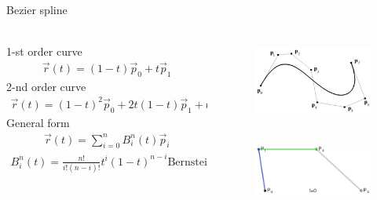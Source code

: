 \documentclass[aspectratio=169]{beamer}
\begin{document}
\begin{frame}[t]{Bezier spline}
\framesubtitle{}
    \begin{columns}[T,onlytextwidth]
        \begin{column}{0.59\textwidth}
            1-st order curve
            \begin{align*}
                \vec{r}(t)=(1-t)\vec{p}_{0}+t\vec{p}_{1}
            \end{align*}
            2-nd order curve
            \begin{align*}
                \vec{r}(t)=(1-t)^{2}\vec{p}_{0}+2t(1-t)\vec{p}_{1}+t^{2}\vec{p}_{2}
            \end{align*}
            General form
            \begin{align*}
                \vec{r}(t) = \sum_{i=0}^{n} B_i^n(t)\vec{p}_i
            \end{align*}
            \begin{align*}
                B_i^n(t) = \frac{n!}{i!(n-i)!}t^i(1-t)^{n-i} \text{Bernstein polynomials}
            \end{align*}
        \end{column}
        \begin{column}{0.39\textwidth}
            \vspace{-1cm}
            \begin{figure}[H]
                \centering\includegraphics[height=2.5cm,width=1\textwidth,keepaspectratio]{bezier_spline_book.png}
                \label{fig:bezier_spline_book.png}
            \end{figure}
            \begin{figure}[H]
                \href{run:./videos/bezier_big.gif}{
                    \centering\includegraphics[height=2.5cm,width=1\textwidth,keepaspectratio]{bezier_big.png}}
            \end{figure}
        \end{column}
    \end{columns}
\end{frame}
\end{document}

